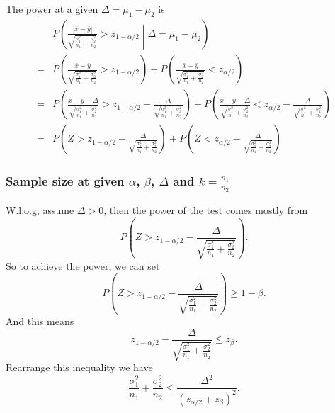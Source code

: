 \documentclass[a4paper,12pt]{article}
\begin{document}
The power at a given $\Delta = \mu_1 - \mu_2$ is
\[
  \begin{aligned}
    & P\left(
      \frac{\left|\bar{x} - \bar{y}\right|}{
        \sqrt{
          \frac{\sigma_1^2}{n_1} + \frac{\sigma_2^2}{n_2}
        }
      }
      > z_{1 - \alpha /2}
      \middle| \Delta = \mu_1 - \mu_2
    \right)    \\
    =& P\left(
      \frac{
        \bar{x} - \bar{y}
      }{
        \sqrt{
          \frac{\sigma_1^2}{n_1} + \frac{\sigma_2^2}{n_2}
        }
      }
      > z_{1 - \alpha / 2}
    \right)
    + P\left(
      \frac{
        \bar{x} - \bar{y}
      }{
        \sqrt{
          \frac{\sigma_1^2}{n_1} + \frac{\sigma_2^2}{n_2}
        }
      }
      < z_{\alpha / 2}
    \right)    \\
    =& P\left(
      \frac{
        \bar{x} - \bar{y}
        - \Delta
      }{
        \sqrt{
          \frac{\sigma_1^2}{n_1} + \frac{\sigma_2^2}{n_2}
        }
      }
      > z_{1 - \alpha / 2}
      - \frac{\Delta}{\sqrt{\frac{\sigma_1^2}{n_1} + \frac{\sigma_2^2}{n_2}}}
    \right)
    + P\left(
      \frac{
        \bar{x} - \bar{y} - \Delta
      }{
        \sqrt{
          \frac{\sigma_1^2}{n_1} + \frac{\sigma_2^2}{n_2}
        }
      }
      < z_{\alpha / 2}
      - \frac{\Delta}{\sqrt{\frac{\sigma_1^2}{n_1} + \frac{\sigma_2^2}{n_2}}}
    \right)    \\
    =& P\left(
      Z
      > z_{1 - \alpha / 2}
      - \frac{\Delta}{\sqrt{\frac{\sigma_1^2}{n_1} + \frac{\sigma_2^2}{n_2}}}
    \right)
    + P\left(
      Z
      < z_{\alpha / 2}
      - \frac{\Delta}{\sqrt{\frac{\sigma_1^2}{n_1} + \frac{\sigma_2^2}{n_2}}}
    \right)
  \end{aligned}
\]

\subsubsection{Sample size at given $\alpha$, $\beta$, $\Delta$ and $k = \frac{n_1}{n_2}$}
\label{sec:sample-size-at-2}

W.l.o.g, assume $\Delta > 0$, then the power of the test comes mostly from
\[
  P\left(
    Z
    > z_{1 - \alpha / 2}
    - \frac{\Delta}{\sqrt{\frac{\sigma_1^2}{n_1} + \frac{\sigma_2^2}{n_2}}}
  \right)
  .
\]
So to achieve the power, we can set
\[
  P\left(
    Z
    > z_{1 - \alpha / 2}
    - \frac{\Delta}{\sqrt{\frac{\sigma_1^2}{n_1} + \frac{\sigma_2^2}{n_2}}}
  \right)
  \geq 1 -\beta
  .
\]
And this means
\[
  z_{1 - \alpha / 2}
  - \frac{\Delta}{\sqrt{\frac{\sigma_1^2}{n_1} + \frac{\sigma_2^2}{n_2}}}
  \leq z_{\beta}
  .
\]
Rearrange this inequality we have
\[
  \frac{\sigma_1^2}{n_1} + \frac{\sigma_2^2}{n_2}
  \leq
  \frac{\Delta^2}{
    \left(
      z_{\alpha / 2} + z_{\beta}
    \right)^2
  }
  .
\]
\end{document}
